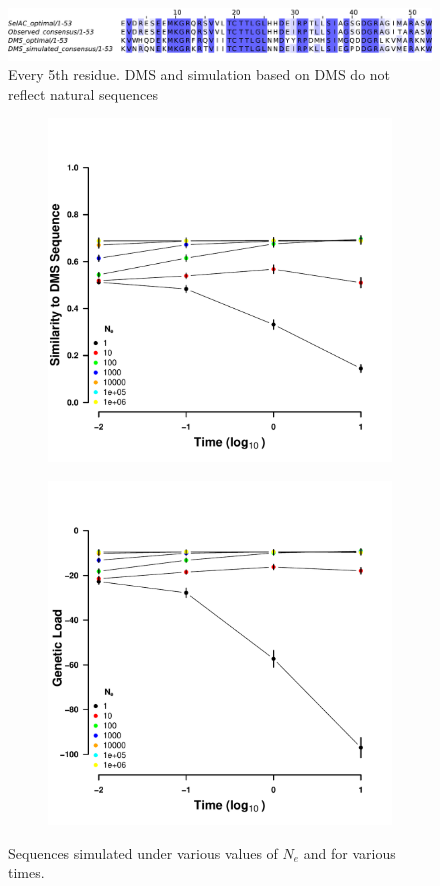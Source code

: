 \documentclass[12pt]{article}
\begin{document}
\begin{figure}[H]
     \centering
	\includegraphics[width=\textwidth]{img/seq_simil_short.pdf}
	\caption{Every 5th residue. DMS and simulation based on DMS do not reflect natural sequences}
	\label{fig:sim_seqs_cons}
\end{figure}

\begin{figure}[h]
    \centering
    \begin{subfigure}
        \centering
        \includegraphics[width=.45\textwidth]{img/simulated_dist_time.pdf}
    \end{subfigure}
    \begin{subfigure}
        \centering
        \includegraphics[width=.45\textwidth]{img/simulated_gl_time.pdf}
    \end{subfigure}
    \caption{Sequences simulated under various values of $N_e$ and for various times.}
    \label{fig:dms_sim}
\end{figure}
\end{document}
